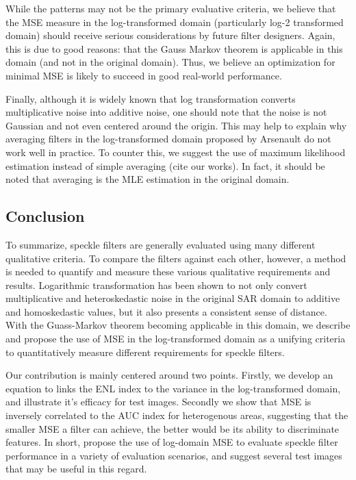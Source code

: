 \documentclass[journal]{IEEEtran}
\begin{document}
While the patterns may not be the primary evaluative criteria, we believe that the MSE measure in the log-transformed domain (particularly log-2 transformed domain) should receive serious considerations by future filter designers. Again, this is due to good reasons: that the Gauss Markov theorem is applicable in this domain (and not in the original domain). Thus, we believe an optimization for minimal MSE is likely to succeed in good real-world performance.


Finally, although it is widely known that log transformation converts multiplicative noise into additive noise, one should note that the noise is not Gaussian and not even centered around the origin. This may help to explain why averaging filters in the log-transformed domain proposed by Arsenault do not work well in practice.
To counter this, we suggest the use of maximum likelihood estimation instead of simple averaging (cite our works). In fact, it should be noted that averaging is the MLE estimation in the original domain.

\subsection{Conclusion}

To summarize, speckle filters are generally evaluated using many different qualitative criteria.
To compare the filters against each other, however, a method is needed to quantify and measure these various qualitative requirements and results.
Logarithmic transformation has been shown to not only convert multiplicative and heteroskedastic noise in the original SAR domain to additive and homoskedastic values, but it also presents a consistent sense of distance.
With the Guass-Markov theorem becoming applicable in this domain, we describe and propose the use of MSE in the log-transformed domain as a unifying criteria to quantitatively measure different requirements for speckle filters.

Our contribution is mainly centered around two points. Firstly, we develop an equation to links the ENL index to the variance in the log-transformed domain, and illustrate it's efficacy for test images.
Secondly we show that MSE is inversely correlated to the AUC index for heterogenous areas, suggesting that the smaller MSE a filter can achieve, the better would be its ability to discriminate features.
In short, propose the use of log-domain MSE to evaluate speckle filter performance in a variety of evaluation scenarios, and suggest several test images that may be useful in this regard.
\end{document}
